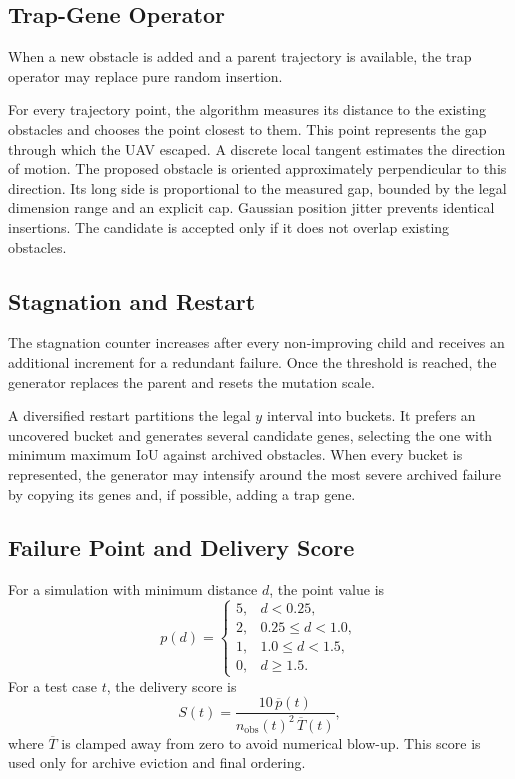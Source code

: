 \documentclass[11pt,a4paper,openany]{report}
\begin{document}
\subsection{Trap-Gene Operator}
When a new obstacle is added and a parent trajectory is available, the trap operator may replace pure random insertion.

For every trajectory point, the algorithm measures its distance to the existing obstacles and chooses the point closest to them. This point represents the gap through which the UAV escaped. A discrete local tangent estimates the direction of motion. The proposed obstacle is oriented approximately perpendicular to this direction. Its long side is proportional to the measured gap, bounded by the legal dimension range and an explicit cap. Gaussian position jitter prevents identical insertions. The candidate is accepted only if it does not overlap existing obstacles.

\subsection{Stagnation and Restart}
The stagnation counter increases after every non-improving child and receives an additional increment for a redundant failure. Once the threshold is reached, the generator replaces the parent and resets the mutation scale.

A diversified restart partitions the legal $y$ interval into buckets. It prefers an uncovered bucket and generates several candidate genes, selecting the one with minimum maximum IoU against archived obstacles. When every bucket is represented, the generator may intensify around the most severe archived failure by copying its genes and, if possible, adding a trap gene.

\subsection{Failure Point and Delivery Score}
For a simulation with minimum distance $d$, the point value is
\[
p(d)=
\begin{cases}
5, & d<0.25,\\
2, & 0.25\le d<1.0,\\
1, & 1.0\le d<1.5,\\
0, & d\ge 1.5.
\end{cases}
\]
For a test case $t$, the delivery score is
\[
S(t)=\frac{10\,\overline{p}(t)}{n_{\mathrm{obs}}(t)^2\,\overline{T}(t)},
\]
where $\overline{T}$ is clamped away from zero to avoid numerical blow-up. This score is used only for archive eviction and final ordering.
\end{document}
